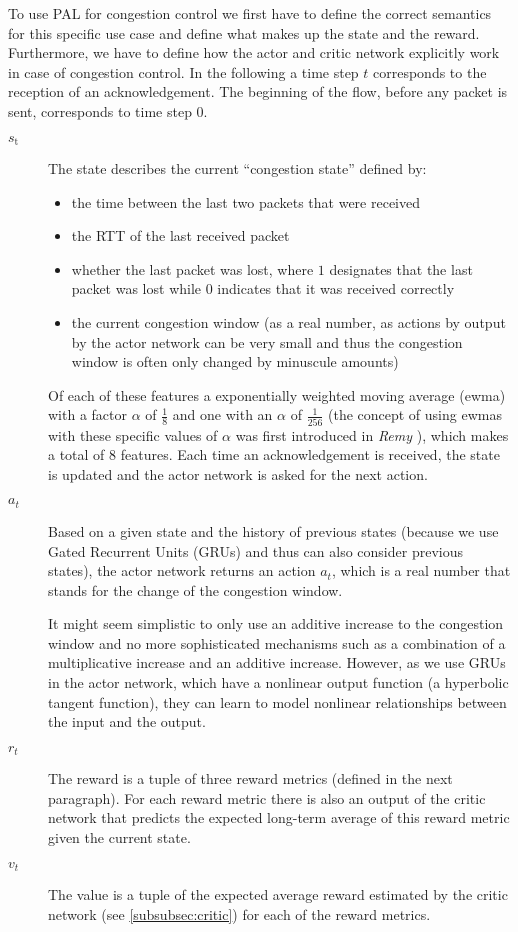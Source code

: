 \documentclass[newfonts=false,format=sigconf,10pt,letterpaper]{acmart}
\begin{document}
To use PAL for congestion control we first have to define the correct semantics for this specific use case and define what makes up the state and the reward. Furthermore, we have to define how the actor and critic network explicitly work in case of congestion control. In the following a time step $t$ corresponds to the reception of an acknowledgement. The beginning of the flow, before any packet is sent, corresponds to time step $0$.

\begin{description}
\item[$\textit{s}_\text{t}$] The state  describes the current ``congestion state'' defined by:
\begin{itemize}
\item the time between the last two packets that were received
\item the RTT of the last received packet
\item whether the last packet was lost, where $1$ designates that the last packet was lost while $0$ indicates that it was received correctly
\item the current congestion window (as a real number, as actions by output by the actor network can be very small and thus the congestion window is often only changed by minuscule amounts)%
\end{itemize}
Of each of these features a exponentially weighted moving average (ewma) with a factor $\alpha$ of $\frac{1}{8}$ and one with an $\alpha$ of $\frac{1}{256}$ (the concept of using ewmas with these specific values of $\alpha$ was first introduced in \textit{Remy} \cite{winstein_tcp_2013}), which makes a total of 8 features.  
Each time an acknowledgement is received, the state is updated and the actor network is asked for the next action.
\item[$\textit{a}_t$] Based on a given state and the history of previous states (because we use Gated Recurrent Units (GRUs) \cite{cho_learning_2014} and thus can also consider previous states), the actor network returns an action $a_t$, which is a real number that stands for the change of the congestion window. 

It might seem simplistic to only use an additive increase to the congestion window and no more sophisticated mechanisms such as a combination of a multiplicative increase and an additive increase. However, as we use GRUs in the actor network, which have a nonlinear output function (a hyperbolic tangent function), they can learn to model nonlinear relationships between the input and the output.  
\item[$\textit{r}_t$] The reward is a tuple of three reward metrics (defined in the next paragraph). 
For each reward metric there is also an output of the critic network that predicts the expected long-term average of this reward metric given the current state. 
\item[$\textit{v}_t$] The value is a tuple of the expected average reward estimated by the critic network (see \autoref{subsubsec:critic}) for each of the reward metrics. 
\end{description}
\end{document}
